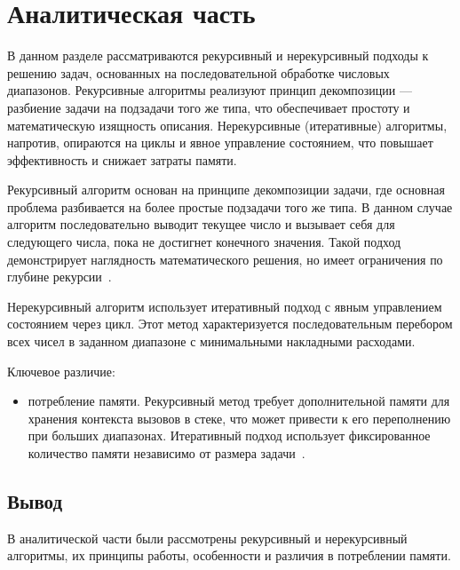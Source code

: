\chapter{Аналитическая часть}



В данном разделе рассматриваются рекурсивный и нерекурсивный подходы к решению задач, основанных на последовательной обработке числовых диапазонов. Рекурсивные алгоритмы реализуют принцип декомпозиции --- разбиение задачи на подзадачи того же типа, что обеспечивает простоту и математическую изящность описания. Нерекурсивные (итеративные) алгоритмы, напротив, опираются на циклы и явное управление состоянием, что повышает эффективность и снижает затраты памяти.



Рекурсивный алгоритм основан на принципе декомпозиции задачи, где основная проблема разбивается на более простые подзадачи того же типа. В данном случае алгоритм последовательно выводит текущее число и вызывает себя для следующего числа, пока не достигнет конечного значения. Такой подход демонстрирует наглядность математического решения, но имеет ограничения по глубине рекурсии~\cite{goloveshkin2020}.

Нерекурсивный алгоритм использует итеративный подход с явным управлением состоянием через цикл. Этот метод характеризуется последовательным перебором всех чисел в заданном диапазоне с минимальными накладными расходами.

Ключевое различие:

\begin{itemize}
	\item потребление памяти. Рекурсивный метод требует дополнительной памяти для хранения контекста вызовов в стеке, что может привести к его переполнению при больших диапазонах. Итеративный подход использует фиксированное количество памяти независимо от размера задачи~\cite{valedinsky2018}.
\end{itemize}


\section*{Вывод}

В аналитической части были рассмотрены рекурсивный и нерекурсивный алгоритмы, их принципы работы, особенности и различия в потреблении памяти.



\clearpage

